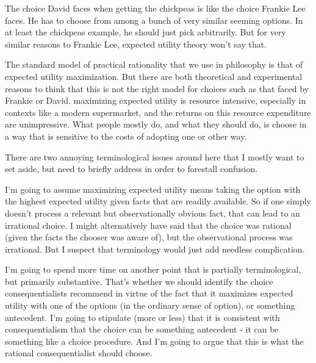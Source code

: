 \documentclass[
  10pt,
  letterpaper,
  DIV=11,
  numbers=noendperiod,
  twoside]{scrartcl}
\begin{document}
The choice David faces when getting the chickpeas is like the choice
Frankie Lee faces. He has to choose from among a bunch of very similar
seeming options. In at least the chickpeas example, he should just pick
arbitrarily. But for very similar reasons to Frankie Lee, expected
utility theory won't say that.

The standard model of practical rationality that we use in philosophy is
that of expected utility maximization. But there are both theoretical
and experimental reasons to think that this is not the right model for
choices such as that faced by Frankie or David. maximizing expected
utility is resource intensive, especially in contexts like a modern
supermarket, and the returns on this resource expenditure are
unimpressive. What people mostly do, and what they should do, is choose
in a way that is sensitive to the costs of adopting one or other way.

There are two annoying terminological issues around here that I mostly
want to set aside, but need to briefly address in order to forestall
confusion.

I'm going to assume maximizing expected utility means taking the option
with the highest expected utility given facts that are readily
available. So if one simply doesn't process a relevant but
observationally obvious fact, that can lead to an irrational choice. I
might alternatively have said that the choice was rational (given the
facts the chooser was aware of), but the observational process was
irrational. But I suspect that terminology would just add needless
complication.

I'm going to spend more time on another point that is partially
terminological, but primarily substantive. That's whether we should
identify the choice consequentialists recommend in virtue of the fact
that it maximizes expected utility with one of the options (in the
ordinary sense of option), or something antecedent. I'm going to
stipulate (more or less) that it is consistent with consequentialism
that the choice can be something antecedent - it can be something like a
choice procedure. And I'm going to argue that this is what the rational
consequentialist should choose.
\end{document}
